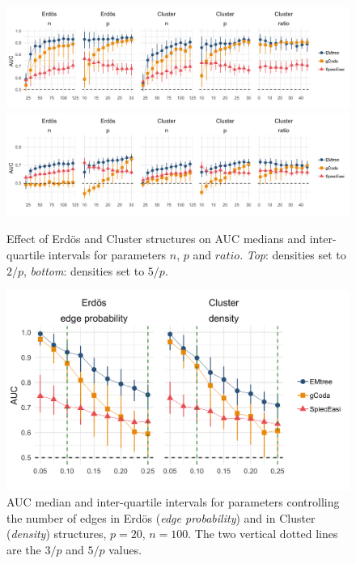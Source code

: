  \begin{figure}[H]
  \centering
   \includegraphics[width=\linewidth]{figs/panel_npFav.png}
  \includegraphics[width=\linewidth]{figs/panel_dense.png}
  \caption{Effect of Erdös and Cluster structures on AUC medians and inter-quartile intervals for parameters $n$, $p$ and $ratio$. \textit{Top}: densities set to $2/p$, \textit{bottom}: densities set to $5/p$.}
  \label{panelErdClust}
\end{figure}

\begin{figure}[H]
 \centering
  \includegraphics[width=0.6\linewidth]{figs/panel_dens_seuils.png}
  \caption{AUC median and inter-quartile intervals for parameters controlling the number of edges in Erdös (\textit{edge probability}) and in Cluster (\textit{density}) structures, $p=20$, $n=100$. The two vertical dotted lines are the $3/p$ and $5/p$ values.}
  \label{varyDens}
\end{figure}
 
